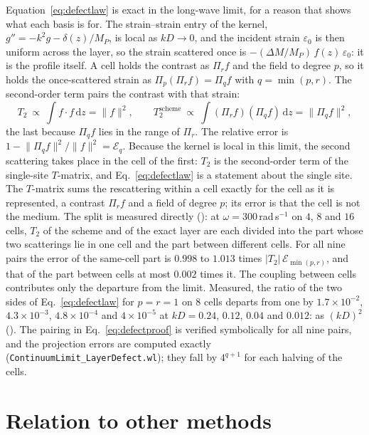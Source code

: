 \documentclass[11pt,a4paper]{article}
\newcommand{\nb}[1]{\texttt{#1}}
\newcommand{\dd}{\mathrm{d}}
\begin{document}
Equation~\eqref{eq:defectlaw} is exact in the long-wave limit, for a reason that shows what each basis
is for. The strain--strain entry of the kernel, $g''=-k^2g-\delta(z)/M_P$, is local as $kD\to0$, and the
incident strain $\varepsilon_0$ is then uniform across the layer, so the strain scattered once is
$-(\Delta M/M_P)\,f(z)\,\varepsilon_0$: it is the profile itself. A cell holds the contrast as
$\Pi_rf$ and the field to degree $p$, so it holds the once-scattered strain as
$\Pi_p(\Pi_rf)=\Pi_qf$ with $q=\min(p,r)$. The second-order term pairs the contrast with that strain:
\begin{equation}\label{eq:defectproof}
  T_2\ \propto\ \int f\cdot f\,\dd z=\lVert f\rVert^2,\qquad
  T_2^{\text{scheme}}\ \propto\ \int(\Pi_rf)(\Pi_qf)\,\dd z=\lVert\Pi_qf\rVert^2,
\end{equation}
the last because $\Pi_qf$ lies in the range of $\Pi_r$. The relative error is
$1-\lVert\Pi_qf\rVert^2/\lVert f\rVert^2=\mathcal{E}_q$. Because the kernel is local in this limit, the
second scattering takes place in the cell of the first: $T_2$ is the second-order term of the
single-site $T$-matrix, and Eq.~\eqref{eq:defectlaw} is a statement about the single site. The
$T$-matrix sums the rescattering within a cell exactly for the cell as it is represented, a contrast
$\Pi_rf$ and a field of degree $p$; its error is that the cell is not the medium. The split is measured directly
(): at $\omega=300$\,rad\,s$^{-1}$ on $4$, $8$ and $16$ cells, $T_2$
of the scheme and of the exact layer are each divided into the part whose two scatterings lie in one cell
and the part between different cells. For all nine pairs the error of the same-cell part is $0.998$ to
$1.013$ times $\lvert T_2\rvert\,\mathcal{E}_{\min(p,r)}$, and that of the part between cells at most
$0.002$ times it. The coupling between cells contributes only the departure from the limit. Measured, the ratio of the two sides of
Eq.~\eqref{eq:defectlaw} for $p=r=1$ on $8$ cells departs from one by $1.7\times10^{-2}$,
$4.3\times10^{-3}$, $4.8\times10^{-4}$ and $4\times10^{-5}$ at $kD=0.24$, $0.12$, $0.04$ and $0.012$: as
$(kD)^2$ (). The pairing in Eq.~\eqref{eq:defectproof} is verified
symbolically for all nine pairs, and the projection errors are computed exactly
(\nb{ContinuumLimit\_LayerDefect.wl}); they fall by $4^{q+1}$ for each halving of the cells.

\FloatBarrier

\section{Relation to other methods}\label{app:related}
\end{document}
